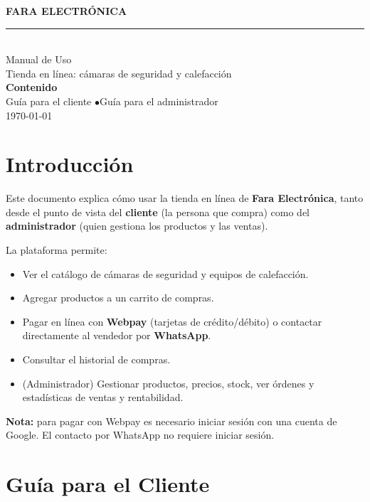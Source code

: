 \documentclass[11pt,a4paper]{article}
\begin{document}
\begin{titlepage}
  \centering
  \vspace*{3cm}
  {\Huge\bfseries\textcolor{faranegro}{FARA ELECTRÓNICA}}\\[0.3cm]
  {\Large\textcolor{faramarillo}{\rule{6cm}{2pt}}}\\[1cm]
  {\LARGE Manual de Uso}\\[0.5cm]
  {\large Tienda en línea: cámaras de seguridad y calefacción}\\[2cm]
  {\large\textbf{Contenido}}\\[0.3cm]
  {\large Guía para el cliente \quad$\bullet$\quad Guía para el administrador}\\[3cm]
  {\large \today}
  \vfill
\end{titlepage}

\tableofcontents
\newpage

\section{Introducción}

Este documento explica cómo usar la tienda en línea de \textbf{Fara Electrónica},
tanto desde el punto de vista del \textbf{cliente} (la persona que compra) como del
\textbf{administrador} (quien gestiona los productos y las ventas).

La plataforma permite:
\begin{itemize}[leftmargin=*]
  \item Ver el catálogo de cámaras de seguridad y equipos de calefacción.
  \item Agregar productos a un carrito de compras.
  \item Pagar en línea con \textbf{Webpay} (tarjetas de crédito/débito) o contactar
        directamente al vendedor por \textbf{WhatsApp}.
  \item Consultar el historial de compras.
  \item (Administrador) Gestionar productos, precios, stock, ver órdenes y estadísticas
        de ventas y rentabilidad.
\end{itemize}

\begin{nota}
\textbf{Nota:} para pagar con Webpay es necesario iniciar sesión con una cuenta de Google.
El contacto por WhatsApp no requiere iniciar sesión.
\end{nota}

\section{Guía para el Cliente}
\end{document}
